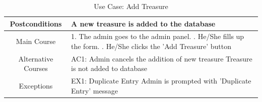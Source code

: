 \documentclass[12pt, a4paper, oneside]{article}
\begin{document}
\begin{table}[H]
\begin{tabularx}{\linewidth}{|c|X|}
Postconditions      & A new treasure is added to the database                                                                                                                                        \\ \hline
Main Course         & 1. The admin goes to the admin panel. \newline 2. He/She fills up the form.  \newline 3. He/She clicks the 'Add Treasure' button \\ \hline
Alternative Courses & AC1: Admin cancels the addition of new treasure \newline Treasure is not added to database                                                                                             \\ \hline
Exceptions          & EX1: Duplicate Entry \newline Admin is prompted with 'Duplicate Entry' message \\ \hline
\end{tabularx}
\caption{Use Case: Add Treasure}
\label{uc-add-treasure}
\end{table}
\end{document}
